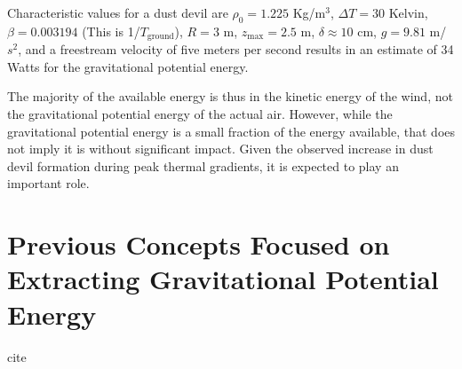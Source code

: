 %
% 
%
%
%


Characteristic values for a dust devil are $\rho_0 = 1.225$ Kg/$\text{m}^3$, 
$\Delta T= 30$ Kelvin, $\beta = 0.003194$ (This is 1/$T_{\text{ground}}$), 
$R = 3 $ m, $z_\text{max} = 2.5$ m, $\delta \approx 10$ cm, $g=9.81$ m/$s^2$, and a
freestream velocity of five meters per second results in an estimate of 34 Watts %
for the gravitational potential energy. 

The majority of the available energy is thus in the kinetic energy of
the wind, not the gravitational potential energy of the actual air. 
However, while the gravitational potential energy is a small fraction of
the energy available, that does not imply it is without significant
impact. 
Given the observed increase in dust devil formation during peak thermal
gradients, it is expected to play an important role. 

\section{Previous Concepts Focused on Extracting Gravitational Potential
 Energy}

cite

